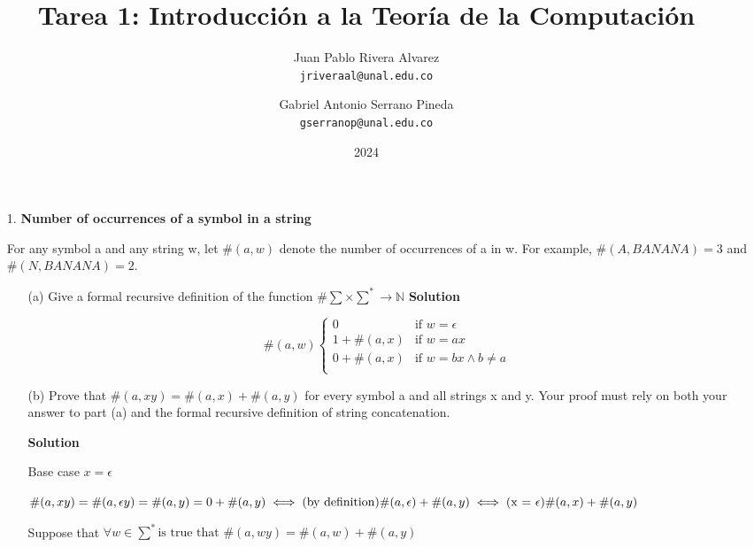 \documentclass[9pt,tikz,border=2mm]{article}
\title{Tarea 1: Introducción a la Teoría de la Computación}
\author{
    Juan Pablo Rivera Alvarez \\
    \texttt{jriveraal@unal.edu.co} \\
    \and
    Gabriel Antonio Serrano Pineda \\
    \texttt{gserranop@unal.edu.co}
}
\date{2024}
\begin{document}
    \begin{enumerate}
        \setcounter{enumi}{0} %
        \item[1.] \textbf{Number of occurrences of a symbol in a string}
    
For any symbol a and any string w, let $\#(a, w)$ denote the number of occurrences of a in w. For example, $\#(A, BANANA) = 3$ and $\#(N, BANANA) = 2$.

        \begin{enumerate}
            \item[(a)] Give a formal recursive definition of the function $\# \sum \times \sum^* \to \mathbb{N}$
            \textbf{Solution}
            
             \[\#(a,w)
                \begin{cases}
                    0 & \text{if } w=\epsilon \\
                    1 + \#(a,x) & \text{if } w=ax\\
                    0 + \#(a,x) & \text{if } w=bx \wedge b \neq a\\
                \end{cases}
            \]\newline
            
            \item[(b)] Prove that $\#(a,xy) = \#(a,x) + \#(a,y)$ for every symbol a and all strings x and y. Your proof must rely on both your answer to part (a) and the formal recursive definition of string concatenation.
            
            \textbf{Solution}\newline

            Base case $x=\epsilon$\newline
            
            $\#(a,xy) = \#(a,\epsilon y) = \#(a,y) = 0 + \#(a,y) \iff \text{(by definition)} \newline  \#(a,\epsilon) + \#(a,y) \iff \text{(x = $\epsilon$)} \newline  \#(a,x) + \#(a,y)$\newline

            Suppose that $\forall w \in \sum^* \text{is true that } \#(a,wy) = \#(a,w) + \#(a,y)$\newline
            

\end{enumerate}
\end{enumerate}
\end{document}
